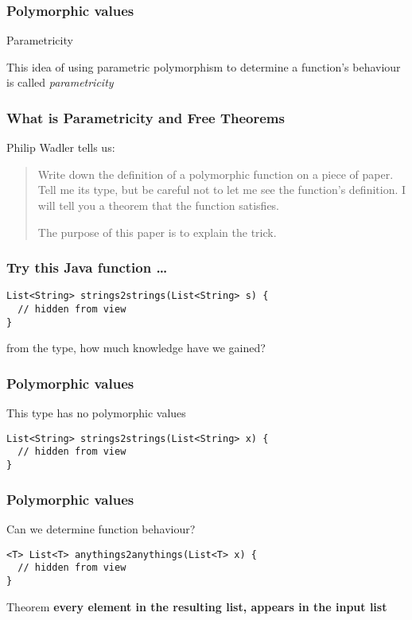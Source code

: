 \begin{frame}[fragile]
\frametitle{Polymorphic values}
\begin{block}{Parametricity}
\begin{center}
This idea of using parametric polymorphism to determine a function's behaviour is called \emph{parametricity}
\end{center}
\end{block}
\end{frame}

\begin{frame}
\frametitle{What is Parametricity and Free Theorems}
\begin{block}{Philip Wadler \cite{wadler1989theorems} tells us:}
\begin{quotation}
Write down the definition of a polymorphic function on a piece of paper. Tell me its type, but be careful not to let me see the function's definition. I will tell you a theorem that the function satisfies.

The purpose of this paper is to explain the trick.
\end{quotation}
\end{block}
\end{frame}

\begin{frame}[fragile]
\frametitle{Try this Java function \ldots}
\begin{block}{}
\begin{lstlisting}[style=java]
List<String> strings2strings(List<String> s) {
  // hidden from view 
}
\end{lstlisting}
\end{block}
\begin{center}
from the type, how much knowledge have we gained?
\end{center}
\end{frame}

\begin{frame}[fragile]
\frametitle{Polymorphic values}
\begin{block}{This type has no polymorphic values}
\begin{lstlisting}[style=java]
List<String> strings2strings(List<String> x) {
  // hidden from view 
}
\end{lstlisting}
\end{block}
\end{frame}

\begin{frame}[fragile]
\frametitle{Polymorphic values}
\begin{block}{Can we determine function behaviour?}
\begin{lstlisting}[style=java]
<T> List<T> anythings2anythings(List<T> x) {
  // hidden from view 
}
\end{lstlisting}
\end{block}
\begin{block}{Theorem}
\textbf{every element in the resulting list, appears in the input list}
\end{block}
\end{frame}

